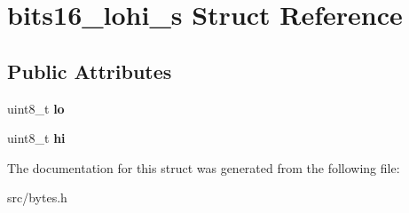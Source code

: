 \hypertarget{structbits16__lohi__s}{}\section{bits16\+\_\+lohi\+\_\+s Struct Reference}
\label{structbits16__lohi__s}
\subsection*{Public Attributes}
\begin{DoxyCompactItemize}
\item 
uint8\+\_\+t {\bfseries lo}\hypertarget{structbits16__lohi__s_ad0b319bb03b45d532afee478c17d54cb}{}\label{structbits16__lohi__s_ad0b319bb03b45d532afee478c17d54cb}

\item 
uint8\+\_\+t {\bfseries hi}\hypertarget{structbits16__lohi__s_ac965f4c8b992ff605dd2dd2ec494a456}{}\label{structbits16__lohi__s_ac965f4c8b992ff605dd2dd2ec494a456}

\end{DoxyCompactItemize}


The documentation for this struct was generated from the following file\+:\begin{DoxyCompactItemize}
\item 
src/bytes.\+h\end{DoxyCompactItemize}
